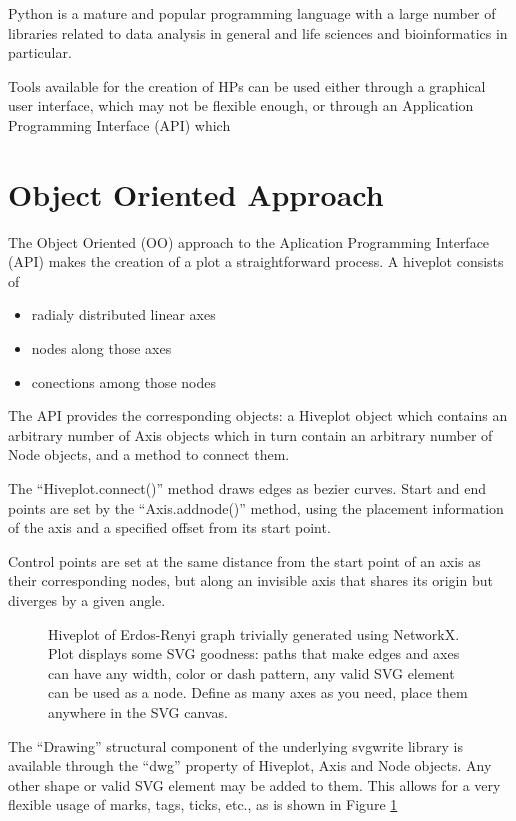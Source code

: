 \documentclass{bioinfo}
\begin{document}
Python is a mature and popular programming language with a large
number of libraries related to data analysis in general and life
sciences and bioinformatics in particular.

Tools available for the creation of HPs can be used either through a
graphical user interface, which may not be flexible enough, or through
an Application Programming Interface (API) which 


\section{Object Oriented Approach}

The Object Oriented (OO) approach to the Aplication Programming
Interface (API) makes the creation of a plot a straightforward
process. A hiveplot consists of 
\begin{itemize}
\item radialy distributed linear axes
\item nodes along those axes
\item conections among those nodes
\end{itemize}
The API provides the corresponding objects: a Hiveplot object which
contains an arbitrary number of Axis objects which in turn contain an
arbitrary number of Node objects, and a method to connect them.

The ``Hiveplot.connect()'' method draws edges as bezier curves. Start and
end points are set by the ``Axis.addnode()'' method, using the placement
information of the axis and a specified offset from its start point.

Control points are set at the same distance from the start point of an
axis as their corresponding nodes, but along an invisible axis that
shares its origin but diverges by a given angle.


\begin{figure}[!tpb]%
  \caption{Hiveplot of Erdos-Renyi graph trivially generated using
    NetworkX. Plot displays some SVG goodness: paths that make edges
    and axes can have any width, color or dash pattern, any valid SVG
    element can be used as a node. Define as many axes as you need,
    place them anywhere in the SVG canvas.}\label{fig:01}
\end{figure}

The ``Drawing'' structural component of the underlying svgwrite
library is available through the ``dwg'' property of Hiveplot, Axis
and Node objects. Any other shape or valid SVG element may be added to
them. This allows for a very flexible usage of marks, tags, ticks,
etc., as is shown in Figure \ref{fig:01}
\end{document}
